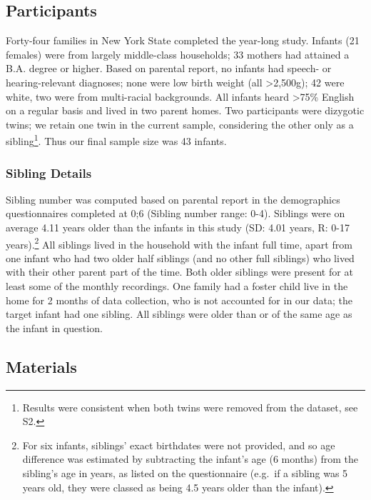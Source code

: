 \documentclass[
  man,mask,floatsintext]{apa6}
\begin{document}
\hypertarget{participants}{%
\subsection{Participants}\label{participants}}

Forty-four families in New York State completed the year-long study. Infants (21 females) were from largely middle-class households; 33 mothers had attained a B.A. degree or higher. Based on parental report, no infants had speech- or hearing-relevant diagnoses; none were low birth weight (all \textgreater2,500g); 42 were white, two were from multi-racial backgrounds. All infants heard \textgreater75\% English on a regular basis and lived in two parent homes. Two participants were dizygotic twins; we retain one twin in the current sample, considering the other only as a sibling\footnote{Results were consistent when both twins were removed from the dataset, see S2.}. Thus our final sample size was 43 infants.

\hypertarget{sibling-details}{%
\subsubsection{Sibling Details}\label{sibling-details}}

Sibling number was computed based on parental report in the demographics questionnaires completed at 0;6 (Sibling number range: 0-4). Siblings were on average 4.11 years older than the infants in this study (SD: 4.01 years, R: 0-17 years).\footnote{For six infants, siblings' exact birthdates were not provided, and so age difference was estimated by subtracting the infant's age (6 months) from the sibling's age in years, as listed on the questionnaire (e.g.~if a sibling was 5 years old, they were classed as being 4.5 years older than the infant).} All siblings lived in the household with the infant full time, apart from one infant who had two older half siblings (and no other full siblings) who lived with their other parent part of the time. Both older siblings were present for at least some of the monthly recordings. One family had a foster child live in the home for 2 months of data collection, who is not accounted for in our data; the target infant had one sibling. All siblings were older than or of the same age as the infant in question.

\hypertarget{materials}{%
\subsection{Materials}\label{materials}}
\end{document}
